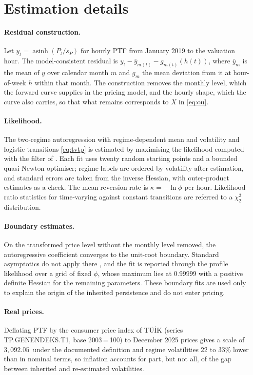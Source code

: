 \section{Estimation details}
\label{app:estimation}

\paragraph{Residual construction.} Let $y_t=\operatorname{asinh}(P_t/s_P)$
for hourly PTF from January 2019 to the valuation hour. The model-consistent
residual is $y_t-\bar y_{m(t)}-g_{m(t)}(h(t))$, where $\bar y_m$ is the mean of
$y$ over calendar month $m$ and $g_m$ the mean deviation from it at hour-of-week
$h$ within that month. The construction removes the monthly level, which the
forward curve supplies in the pricing model, and the hourly shape, which the
curve also carries, so that what remains corresponds to $X$ in \eqref{eq:ou}.

\paragraph{Likelihood.} The two-regime autoregression with regime-dependent
mean and volatility and logistic transitions \eqref{eq:tvtp} is estimated by
maximising the likelihood computed with the filter of \citet{Hamilton1989}.
Each fit uses twenty random starting points and a bounded quasi-Newton
optimiser; regime labels are ordered by volatility after estimation, and
standard errors are taken from the inverse Hessian, with outer-product
estimates as a check. The mean-reversion rate is $\kappa=-\ln\phi$ per hour.
Likelihood-ratio statistics for time-varying against constant transitions are
referred to a $\chi^2_2$ distribution.

\paragraph{Boundary estimates.} On the transformed price level without the
monthly level removed, the autoregressive coefficient converges to the unit-root
boundary. Standard asymptotics do not apply there \citep{Andrews2001}, and the
fit is reported through the profile likelihood over a grid of fixed $\phi$,
whose maximum lies at $0.99999$ with a positive definite Hessian for the
remaining parameters. These boundary fits are used only to explain the origin
of the inherited persistence and do not enter pricing.

\paragraph{Real prices.} Deflating PTF by the consumer price index of
TÜİK (series TP.GENENDEKS.T1, base 2003\,=\,100) to December 2025 prices gives
a scale of $3{,}092.05$\,\TRY{} under the documented definition and regime
volatilities 22 to 33\% lower than in nominal terms, so inflation accounts for
part, but not all, of the gap between inherited and re-estimated volatilities.
